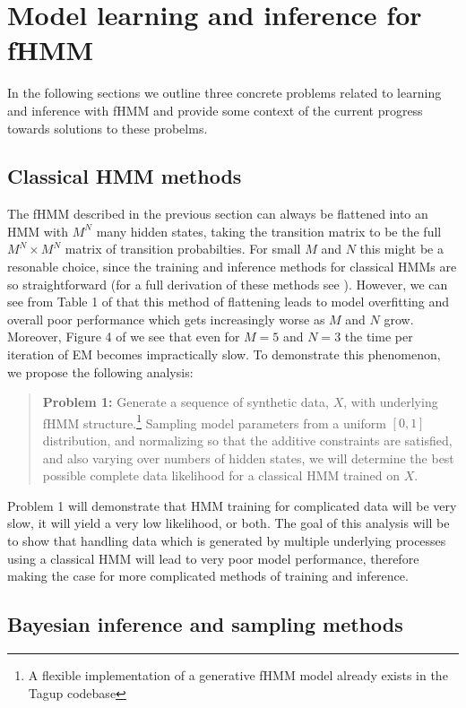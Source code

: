 \documentclass{article}
\begin{document}
\section{Model learning and inference for fHMM}\label{problems}
In the following sections we outline three concrete problems related to learning and inference with fHMM and provide some context of the current progress towards solutions to these probelms.
\subsection{Classical HMM methods}

The fHMM described in the previous section can always be flattened into an HMM with $M^N$ many hidden states, taking the transition matrix to be the full $M^N\times M^N$ matrix of transition probabilties.  For small $M$ and $N$ this might be a resonable choice, since the training and inference methods for classical HMMs are so straightforward (for a full derivation of these methods see \cite{HVB20}).  However, we can see from Table 1 of \cite{GJ95} that this method of flattening leads to model overfitting and overall poor performance which gets increasingly worse as $M$ and $N$ grow. Moreover, Figure 4 of \cite{GJ95} we see that even for $M=5$ and $N=3$ the time per iteration of EM becomes impractically slow.  To demonstrate this phenomenon, we propose the following analysis: 

\begin{quote}
\textbf{Problem 1:} Generate a sequence of synthetic data, $X$, with underlying fHMM structure.\footnote{A flexible implementation of a generative fHMM model already exists in the Tagup codebase}  Sampling model parameters from a uniform $[0,1]$ distribution, and normalizing so that the additive constraints are satisfied, and also varying over numbers of hidden states, we will determine the best possible complete data likelihood for a classical HMM trained on $X$. 
\end{quote}
Problem 1 will demonstrate that HMM training for complicated data will be very slow, it will yield a very low likelihood, or both.  The goal of this analysis will be to show that handling data which is generated by multiple underlying processes using a classical HMM will lead to very poor model performance, therefore making the case for more complicated methods of training and inference.  

\subsection{Bayesian inference and sampling methods}
\end{document}
